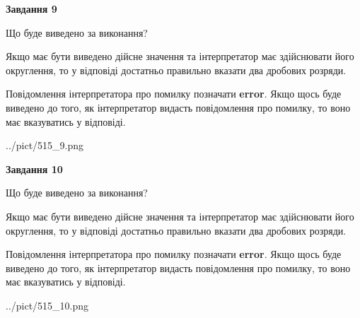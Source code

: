 \documentclass[12pt, ukrainian]{article}
\begin{document}
{\begin {Large}
{\begin {center}\textbf{Завдання 9}\end {center}}\par
Що буде виведено за виконання? \par

Якщо має бути виведено дійсне значення та інтерпретатор має здійснювати його округлення, 
то у відповіді достатньо правильно вказати два дробових розряди.

Повідомлення інтерпретатора про помилку позначати \textbf{error}.
Якщо щось буде виведено до того, як інтерпретатор видасть повідомлення про помилку, 
то воно має вказуватись у відповіді. \par

\begin{center}
	{../pict/515_9.png}
\end{center}
\newpage

{\begin {center}\textbf{Завдання 10}\end {center}}\par
Що буде виведено за виконання? \par

Якщо має бути виведено дійсне значення та інтерпретатор має здійснювати його округлення, 
то у відповіді достатньо правильно вказати два дробових розряди.

Повідомлення інтерпретатора про помилку позначати \textbf{error}.
Якщо щось буде виведено до того, як інтерпретатор видасть повідомлення про помилку, 
то воно має вказуватись у відповіді. \par

\begin{center}
	{../pict/515_10.png}
\end{center}
\newpage

\end {Large}}
\end{document}
